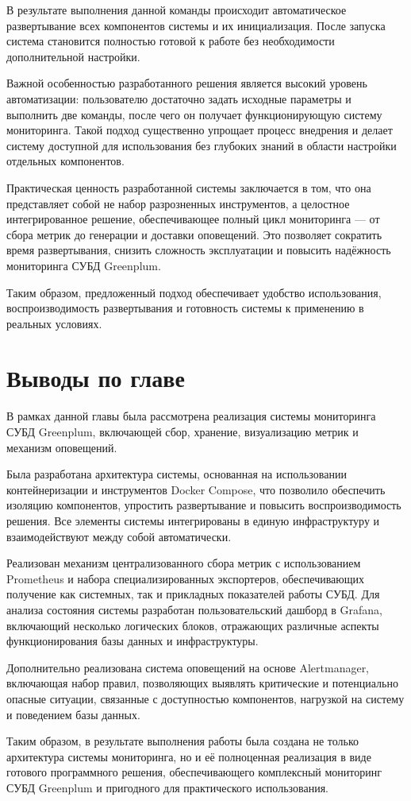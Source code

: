 В результате выполнения данной команды происходит автоматическое развертывание всех компонентов системы и их инициализация. После запуска система становится полностью готовой к работе без необходимости дополнительной настройки.

Важной особенностью разработанного решения является высокий уровень автоматизации: пользователю достаточно задать исходные параметры и выполнить две команды, после чего он получает функционирующую систему мониторинга. Такой подход существенно упрощает процесс внедрения и делает систему доступной для использования без глубоких знаний в области настройки отдельных компонентов.

Практическая ценность разработанной системы заключается в том, что она представляет собой не набор разрозненных инструментов, а целостное интегрированное решение, обеспечивающее полный цикл мониторинга — от сбора метрик до генерации и доставки оповещений. Это позволяет сократить время развертывания, снизить сложность эксплуатации и повысить надёжность мониторинга СУБД Greenplum.

Таким образом, предложенный подход обеспечивает удобство использования, воспроизводимость развертывания и готовность системы к применению в реальных условиях.


\section{Выводы по главе} \label{ch2:conclusion}

В рамках данной главы была рассмотрена реализация системы мониторинга СУБД Greenplum, включающей сбор, хранение, визуализацию метрик и механизм оповещений.

Была разработана архитектура системы, основанная на использовании контейнеризации и инструментов Docker Compose, что позволило обеспечить изоляцию компонентов, упростить развертывание и повысить воспроизводимость решения. Все элементы системы интегрированы в единую инфраструктуру и взаимодействуют между собой автоматически.

Реализован механизм централизованного сбора метрик с использованием Prometheus и набора специализированных экспортеров, обеспечивающих получение как системных, так и прикладных показателей работы СУБД. Для анализа состояния системы разработан пользовательский дашборд в Grafana, включающий несколько логических блоков, отражающих различные аспекты функционирования базы данных и инфраструктуры.

Дополнительно реализована система оповещений на основе Alertmanager, включающая набор правил, позволяющих выявлять критические и потенциально опасные ситуации, связанные с доступностью компонентов, нагрузкой на систему и поведением базы данных.

Таким образом, в результате выполнения работы была создана не только архитектура системы мониторинга, но и её полноценная реализация в виде готового программного решения, обеспечивающего комплексный мониторинг СУБД Greenplum и пригодного для практического использования.

